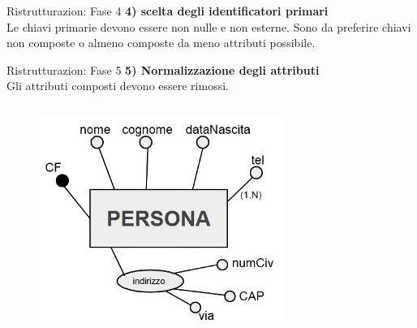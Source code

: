 %
\begin{frame}{Ristrutturazion: Fase 4}
\vspace{-3cm}
\textbf{4) scelta degli identificatori primari}
\\\vspace{2em}
Le chiavi primarie devono essere non nulle e non esterne. Sono da preferire chiavi non composte o almeno composte da meno attributi possibile.
\end{frame}
%
\begin{frame}{Ristrutturazion: Fase 5}
\textbf{5) Normalizzazione degli attributi}
\\\vspace{2em}
Gli attributi composti devono essere rimossi.
\begin{columns}
        \begin{column}{0.5\textwidth}
            \begin{figure}[h]
        \centering
        \includegraphics[width=0.75\textwidth]{img/i10.png}
    \end{figure}
        \end{column}
        \begin{column}{0.5\textwidth}
\end{column}
\end{columns}
\end{frame}
